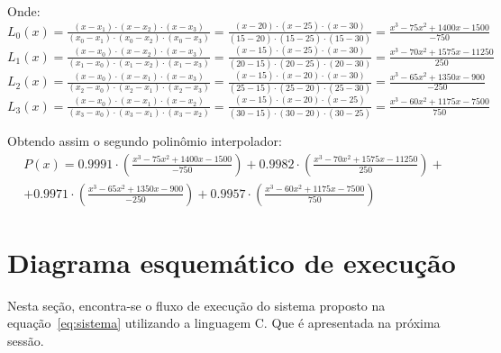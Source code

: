 \documentclass[12pt, hidelinks]{article}
\begin{document}
Onde: \\
$L_0(x) = \frac{(x - x_1)\cdot(x - x_2)\cdot(x - x_3)}{(x_0 - x_1)\cdot(x_0 - x_2)\cdot(x_0 - x_3)} = \frac{(x - 20)\cdot(x - 25)\cdot(x - 30)}{(15 - 20)\cdot(15 - 25)\cdot(15 - 30)} = \frac{x^3 - 75x^2 + 1400x - 1500}{-750}$\\
$L_1(x) = \frac{(x - x_0)\cdot(x - x_2)\cdot(x - x_3)}{(x_1 - x_0)\cdot(x_1 - x_2)\cdot(x_1 - x_3)} = \frac{(x - 15)\cdot(x - 25)\cdot(x - 30)}{(20 - 15)\cdot(20 - 25)\cdot(20 - 30)} = \frac{x^3 - 70x^2 + 1575x - 11250}{250}$\\
$L_2(x) = \frac{(x - x_0)\cdot(x - x_1)\cdot(x - x_3)}{(x_2 - x_0)\cdot(x_2 - x_1)\cdot(x_2 - x_3)} = \frac{(x - 15)\cdot(x - 20)\cdot(x - 30)}{(25 - 15)\cdot(25 - 20)\cdot(25 - 30)} = \frac{x^3 - 65x^2 + 1350x - 900}{-250}$\\
$L_3(x) = \frac{(x - x_0)\cdot(x - x_1)\cdot(x - x_2)}{(x_3 - x_0)\cdot(x_3 - x_1)\cdot(x_3 - x_2)} = \frac{(x - 15)\cdot(x - 20)\cdot(x - 25)}{(30 - 15)\cdot(30 - 20)\cdot(30 - 25)} = \frac{x^3 - 60x^2 + 1175x - 7500}{750}$

Obtendo assim o segundo polinômio interpolador:
\begin{eqnarray}\label{eq:pi2}
  P(x) = 0.9991 \cdot \left(\frac{x^3 - 75x^2 + 1400x - 1500}{-750}\right) + 0.9982 \cdot \left(\frac{x^3 - 70x^2 + 1575x - 11250}{250}\right) + \nonumber \\
  + 0.9971 \cdot \left(\frac{x^3 - 65x^2 + 1350x - 900}{-250}\right) + 0.9957 \cdot \left(\frac{x^3 - 60x^2 + 1175x - 7500}{750}\right)
\end{eqnarray}

\newpage
\section{Diagrama esquemático de execução}

Nesta seção, encontra-se o fluxo de execução do sistema proposto na equação~\eqref{eq:sistema} utilizando
a linguagem C. Que é apresentada na próxima sessão.
\end{document}
